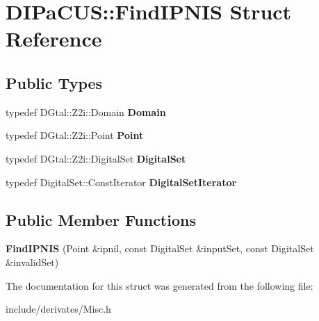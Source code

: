 \hypertarget{structDIPaCUS_1_1FindIPNIS}{}\section{D\+I\+Pa\+C\+US\+:\+:Find\+I\+P\+N\+IS Struct Reference}
\label{structDIPaCUS_1_1FindIPNIS}
\subsection*{Public Types}
\begin{DoxyCompactItemize}
\item 
\mbox{\label{structDIPaCUS_1_1FindIPNIS_aded28da4fed2a2e66bc351a03390f852}} 
typedef D\+Gtal\+::\+Z2i\+::\+Domain {\bfseries Domain}
\item 
\mbox{\label{structDIPaCUS_1_1FindIPNIS_ad49a837b1c884c2d6c65c51df1f37d02}} 
typedef D\+Gtal\+::\+Z2i\+::\+Point {\bfseries Point}
\item 
\mbox{\label{structDIPaCUS_1_1FindIPNIS_adcfac1636cb07cd758ec0a90fdc2d1a0}} 
typedef D\+Gtal\+::\+Z2i\+::\+Digital\+Set {\bfseries Digital\+Set}
\item 
\mbox{\label{structDIPaCUS_1_1FindIPNIS_a970fae0418a8a2463acefba1361dd9e5}} 
typedef Digital\+Set\+::\+Const\+Iterator {\bfseries Digital\+Set\+Iterator}
\end{DoxyCompactItemize}
\subsection*{Public Member Functions}
\begin{DoxyCompactItemize}
\item 
\mbox{\label{structDIPaCUS_1_1FindIPNIS_a8b5248a6747499fb16bd8fecccb08abd}} 
{\bfseries Find\+I\+P\+N\+IS} (Point \&ipnil, const Digital\+Set \&input\+Set, const Digital\+Set \&invalid\+Set)
\end{DoxyCompactItemize}


The documentation for this struct was generated from the following file\+:\begin{DoxyCompactItemize}
\item 
include/derivates/Misc.\+h\end{DoxyCompactItemize}
